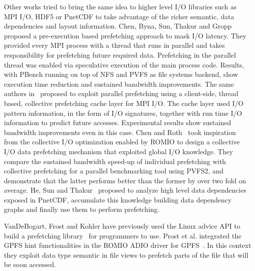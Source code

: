 Other works tried to bring the same idea to higher level I/O libraries such as MPI I/O, HDF5 or PnetCDF to take advantage of the richer semantic, data dependencies and layout information. Chen, Byna, Sun, Thakur and Gropp~\cite{ChenBSTG08} proposed a pre-execution based prefetching approach to mask I/O latency. They provided every MPI process with a thread that runs in parallel and takes responsibility for prefetching future required data. Prefetching in the parallel thread was enabled via speculative execution of the main process code. Results, with PBench running on top of NFS and PVFS as file systems backend, show execution time reduction and sustained bandwidth improvements.
The same authors in~\cite{BynaCST08} proposed to exploit parallel prefetching using a client-side, thread based, collective prefetching cache layer for MPI I/O. The cache layer used I/O pattern information, in the form of I/O signatures, together with run time I/O information to predict future accesses. Experimental results show sustained bandwidth improvements even in this case. 
Chen and Roth~\cite{ChenR10} took inspiration from the collective I/O optimization enabled by ROMIO to design a collective I/O data prefetching mechanism that exploited global I/O knowledge. They compare the sustained bandwidth speed-up of individual prefetching with collective prefetching for a parallel benchmarking tool using PVFS2, and demonstrate that the latter performs better than the former by over two fold on average. 
He, Sun and Thakur~\cite{HEST12} proposed to analyze high level data dependencies exposed in PnetCDF, accumulate this knowledge building data dependency graphs and finally use them to perform prefetching. 

VanDeBogart, Frost and Kohler have previously used the Linux advice API to build a prefetching library~\cite{VanDeBogartFK09} for programmers to use. Prost et al. integrated the GPFS hint functionalities in the ROMIO ADIO driver for GPFS~\cite{ProstTHJK01}. In this context they exploit data type semantic in file views to prefetch parts of the file that will be soon accessed. 


